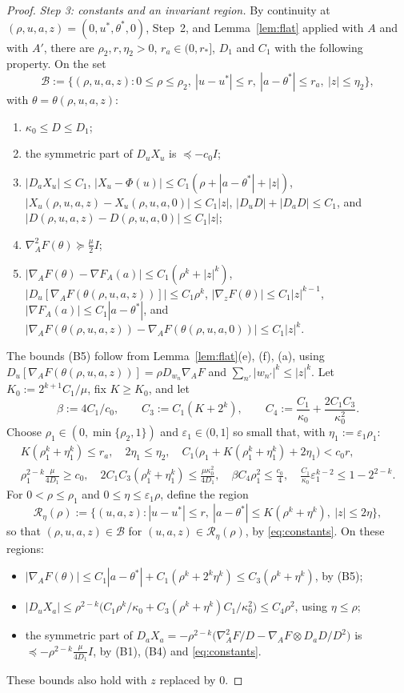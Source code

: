 \documentclass[11pt]{article}
\theoremstyle{definition}
\theoremstyle{remark}
\numberwithin{equation}{section}
\newcommand{\cB}{\mathcal{B}}
\newcommand{\cR}{\mathcal{R}}
\newcommand{\eps}{\varepsilon}
\begin{document}
\begin{proof}
\emph{Step 3: constants and an invariant region.} By continuity at $(\rho,u,a,z)=(0,u^*,\theta^*,0)$, Step~2, and Lemma~\ref{lem:flat} applied with $A$ and with $A'$, there are $\rho_2,r,\eta_2>0$, $r_a\in(0,r_*]$, $D_1$ and $C_1$ with the following property. On the set
\[
\cB:=\{(\rho,u,a,z):0\le\rho\le\rho_2,\ |u-u^*|\le r,\ |a-\theta^*|\le r_a,\ |z|\le\eta_2\},
\]
with $\theta=\theta(\rho,u,a,z)$:
\begin{enumerate}[label=(B\arabic*),leftmargin=3.5em]
\item $\kappa_0\le D\le D_1$;
\item the symmetric part of $D_uX_u$ is $\preceq-c_0I$;
\item $|D_aX_u|\le C_1$, $|X_u-\Phi(u)|\le C_1(\rho+|a-\theta^*|+|z|)$, $|X_u(\rho,u,a,z)-X_u(\rho,u,a,0)|\le C_1|z|$, $|D_uD|+|D_aD|\le C_1$, and $|D(\rho,u,a,z)-D(\rho,u,a,0)|\le C_1|z|$;
\item $\nabla^2_AF(\theta)\succeq\frac\mu2I$;
\item $|\nabla_AF(\theta)-\nabla F_A(a)|\le C_1(\rho^k+|z|^k)$, $|D_u[\nabla_AF(\theta(\rho,u,a,z))]|\le C_1\rho^k$, $|\nabla_zF(\theta)|\le C_1|z|^{k-1}$, $|\nabla F_A(a)|\le C_1|a-\theta^*|$, and $|\nabla_AF(\theta(\rho,u,a,z))-\nabla_AF(\theta(\rho,u,a,0))|\le C_1|z|^k$.
\end{enumerate}
The bounds (B5) follow from Lemma~\ref{lem:flat}(e), (f), (a), using $D_u[\nabla_AF(\theta(\rho,u,a,z))]=\rho D_{w_n}\nabla_AF$ and $\sum_{n'}|w_{n'}|^k\le|z|^k$. Let $K_0:=2^{k+1}C_1/\mu$, fix $K\ge K_0$, and let
\[
\beta:=4C_1/c_0,\qquad C_3:=C_1(K+2^k),\qquad C_4:=\frac{C_1}{\kappa_0}+\frac{2C_1C_3}{\kappa_0^2}.
\]
Choose $\rho_1\in(0,\min\{\rho_2,1\})$ and $\eps_1\in(0,1]$ so small that, with $\eta_1:=\eps_1\rho_1$:
\begin{equation}\label{eq:constants}
\begin{gathered}
K(\rho_1^k+\eta_1^k)\le r_a,\quad 2\eta_1\le\eta_2,\quad C_1\big(\rho_1+K(\rho_1^k+\eta_1^k)+2\eta_1\big)<c_0r,\\
\rho_1^{2-k}\frac{\mu}{4D_1}\ge c_0,\quad 2C_1C_3(\rho_1^k+\eta_1^k)\le\frac{\mu\kappa_0^2}{4D_1},\quad \beta C_4\rho_1^2\le\frac{c_0}4,\quad \frac{C_1}{\kappa_0}\eps_1^{k-2}\le1-2^{2-k}.
\end{gathered}
\end{equation}
For $0<\rho\le\rho_1$ and $0\le\eta\le\eps_1\rho$, define the region
\[
\cR_\eta(\rho):=\{(u,a,z):|u-u^*|\le r,\ |a-\theta^*|\le K(\rho^k+\eta^k),\ |z|\le2\eta\},
\]
so that $(\rho,u,a,z)\in\cB$ for $(u,a,z)\in\cR_\eta(\rho)$, by \eqref{eq:constants}. On these regions:
\begin{itemize}
\item $|\nabla_AF(\theta)|\le C_1|a-\theta^*|+C_1(\rho^k+2^k\eta^k)\le C_3(\rho^k+\eta^k)$, by (B5);
\item $|D_uX_a|\le\rho^{2-k}\big(C_1\rho^k/\kappa_0+C_3(\rho^k+\eta^k)C_1/\kappa_0^2\big)\le C_4\rho^2$, using $\eta\le\rho$;
\item the symmetric part of $D_aX_a=-\rho^{2-k}\big(\nabla^2_AF/D-\nabla_AF\otimes D_aD/D^2\big)$ is $\preceq-\rho^{2-k}\frac{\mu}{4D_1}I$, by (B1), (B4) and \eqref{eq:constants}.
\end{itemize}
These bounds also hold with $z$ replaced by $0$.


\end{proof}
\end{document}
